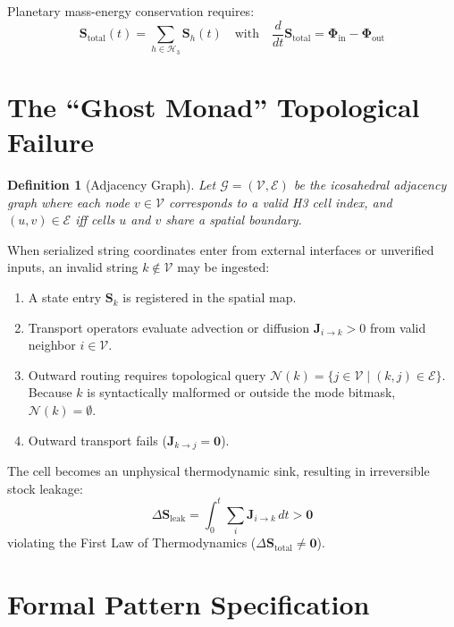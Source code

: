 \documentclass[11pt,a4paper]{article}
\newtheorem{definition}{Definition}
\begin{document}
Planetary mass-energy conservation requires:
\begin{equation}
\mathbf{S}_{\text{total}}(t) = \sum_{h \in \mathcal{H}_3} \mathbf{S}_h(t) \quad \text{with} \quad \frac{d}{dt}\mathbf{S}_{\text{total}} = \mathbf{\Phi}_{\text{in}} - \mathbf{\Phi}_{\text{out}}
\end{equation}

\section{The ``Ghost Monad'' Topological Failure}

\begin{definition}[Adjacency Graph]
Let $\mathcal{G} = (\mathcal{V}, \mathcal{E})$ be the icosahedral adjacency graph where each node $v \in \mathcal{V}$ corresponds to a valid H3 cell index, and $(u, v) \in \mathcal{E}$ iff cells $u$ and $v$ share a spatial boundary.
\end{definition}

When serialized string coordinates enter from external interfaces or unverified inputs, an invalid string $k \notin \mathcal{V}$ may be ingested:
\begin{enumerate}
    \item A state entry $\mathbf{S}_k$ is registered in the spatial map.
    \item Transport operators evaluate advection or diffusion $\mathbf{J}_{i \to k} > 0$ from valid neighbor $i \in \mathcal{V}$.
    \item Outward routing requires topological query $\mathcal{N}(k) = \{ j \in \mathcal{V} \mid (k, j) \in \mathcal{E} \}$. Because $k$ is syntactically malformed or outside the mode bitmask, $\mathcal{N}(k) = \emptyset$.
    \item Outward transport fails ($\mathbf{J}_{k \to j} = \mathbf{0}$).
\end{enumerate}

The cell becomes an unphysical thermodynamic sink, resulting in irreversible stock leakage:
\begin{equation}
\Delta \mathbf{S}_{\text{leak}} = \int_0^t \sum_{i} \mathbf{J}_{i \to k} \, dt > \mathbf{0}
\end{equation}
violating the First Law of Thermodynamics ($\Delta \mathbf{S}_{\text{total}} \ne \mathbf{0}$).

\section{Formal Pattern Specification}
\end{document}
